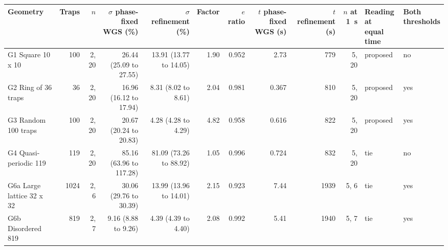 \begin{tabular}{@{}l r r r r r r r r r l l@{}}
\toprule
Geometry & Traps & $n$ & \shortstack[r]{$\sigma$ phase-fixed\\WGS (\%)} & \shortstack[r]{$\sigma$ refinement\\(\%)} & Factor & $e$ ratio & \shortstack[r]{$t$ phase-fixed\\WGS (s)} & \shortstack[r]{$t$ refinement\\(s)} & $n$ at 1~s & \shortstack[l]{Reading at\\equal time} & \shortstack[l]{Both\\thresholds} \\
\midrule
G1 Square 10 x 10 & 100 & 2, 20 & 26.44 (25.09 to 27.55) & 13.91 (13.77 to 14.05) & 1.90 & 0.952 & 2.73 & 779 & 5, 20 & proposed & no \\
G2 Ring of 36 traps & 36 & 2, 20 & 16.96 (16.12 to 17.94) & 8.31 (8.02 to 8.61) & 2.04 & 0.981 & 0.367 & 810 & 5, 20 & proposed & yes \\
G3 Random 100 traps & 100 & 2, 20 & 20.67 (20.24 to 20.83) & 4.28 (4.28 to 4.29) & 4.82 & 0.958 & 0.616 & 822 & 5, 20 & proposed & yes \\
G4 Quasi-periodic 119 & 119 & 2, 20 & 85.16 (63.96 to 117.28) & 81.09 (73.26 to 88.92) & 1.05 & 0.996 & 0.724 & 832 & 5, 20 & tie & no \\
G6a Large lattice 32 x 32 & 1024 & 2, 6 & 30.06 (29.76 to 30.39) & 13.99 (13.96 to 14.01) & 2.15 & 0.923 & 7.44 & 1939 & 5, 6 & tie & yes \\
G6b Disordered 819 & 819 & 2, 7 & 9.16 (8.88 to 9.26) & 4.39 (4.39 to 4.40) & 2.08 & 0.992 & 5.41 & 1940 & 5, 7 & tie & yes \\
\bottomrule
\end{tabular}

